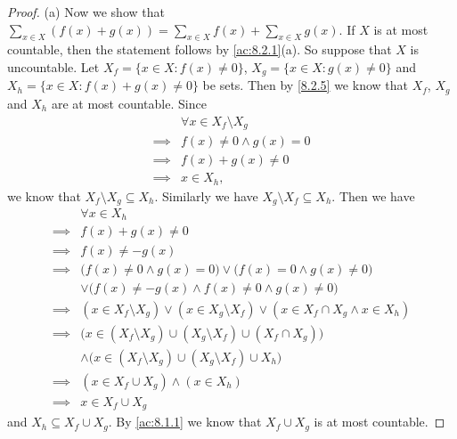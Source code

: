\begin{proof}{(a)}
  Now we show that \(\sum_{x \in X} (f(x) + g(x)) = \sum_{x \in X} f(x) + \sum_{x \in X} g(x)\).
  If \(X\) is at most countable, then the statement follows by \cref{ac:8.2.1}(a).
  So suppose that \(X\) is uncountable.
  Let \(X_f = \{x \in X : f(x) \neq 0\}\), \(X_g = \{x \in X : g(x) \neq 0\}\) and \(X_h = \{x \in X : f(x) + g(x) \neq 0\}\) be sets.
  Then by \cref{8.2.5} we know that \(X_f\), \(X_g\) and \(X_h\) are at most countable.
  Since
  \begin{align*}
             & \forall x \in X_f \setminus X_g \\
    \implies & f(x) \neq 0 \land g(x) = 0      \\
    \implies & f(x) + g(x) \neq 0              \\
    \implies & x \in X_h,
  \end{align*}
  we know that \(X_f \setminus X_g \subseteq X_h\).
  Similarly we have \(X_g \setminus X_f \subseteq X_h\).
  Then we have
  \begin{align*}
             & \forall x \in X_h                                                                                  \\
    \implies & f(x) + g(x) \neq 0                                                                                 \\
    \implies & f(x) \neq -g(x)                                                                                    \\
    \implies & \big(f(x) \neq 0 \land g(x) = 0\big) \lor \big(f(x) = 0 \land g(x) \neq 0\big)                     \\
             & \lor \big(f(x) \neq -g(x) \land f(x) \neq 0 \land g(x) \neq 0\big)                                 \\
    \implies & (x \in X_f \setminus X_g) \lor (x \in X_g \setminus X_f) \lor (x \in X_f \cap X_g \land x \in X_h) \\
    \implies & \big(x \in (X_f \setminus X_g) \cup (X_g \setminus X_f) \cup (X_f \cap X_g)\big)                   \\
             & \land \big(x \in (X_f \setminus X_g) \cup (X_g \setminus X_f) \cup X_h\big)                        \\
    \implies & (x \in X_f \cup X_g) \land (x \in X_h)                                                             \\
    \implies & x \in X_f \cup X_g
  \end{align*}
  and \(X_h \subseteq X_f \cup X_g\).
  By \cref{ac:8.1.1} we know that \(X_f \cup X_g\) is at most countable.

\end{proof}
